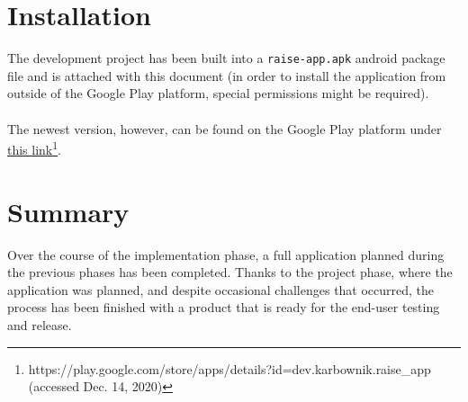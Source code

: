 \section{Installation}\label{sec:implementation:installation}
The development project has been built into a \texttt{raise-app.apk} android package file and is attached with this document (in order to install the application from outside of the Google Play platform, special permissions might be required).
\\\\
The newest version, however, can be found on the Google Play platform under \href{https://play.google.com/store/apps/details?id=dev.karbownik.raisef\_app}{this link}\footnote{https://play.google.com/store/apps/details?id=dev.karbownik.raise\_app (accessed Dec. 14, 2020)}.

\section{Summary}\label{sec:implementation:summary}
Over the course of the implementation phase, a full application planned during the previous phases has been completed. Thanks to the project phase, where the application was planned, and despite occasional challenges that occurred, the process has been finished with a product that is ready for the end-user testing and release.